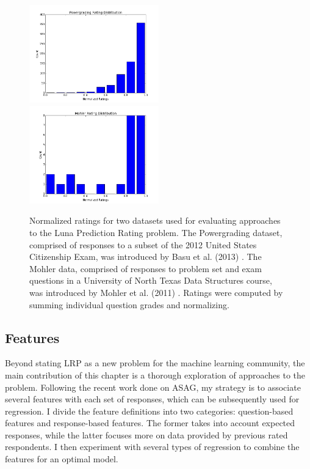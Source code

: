 \begin{figure}[h]
\centerline{%
\includegraphics[width=0.5\textwidth]{figures/powerGradingDistribution.png}%
\includegraphics[width=0.5\textwidth] {figures/mohlerRatings.png}%
}%
\caption{Normalized ratings for two datasets used for evaluating approaches to the Luna Prediction Rating problem. The Powergrading dataset, comprised of responses to a subset of the 2012 United States Citizenship Exam, was introduced by Basu et al. (2013)  \citep{basu2013powergrading}. The Mohler data, comprised of responses to problem set and exam questions in a University of North Texas Data Structures course, was introduced by Mohler et al. (2011)  \citep{mohler2011learning}. Ratings were computed by summing individual question grades and normalizing.}
\label{fig:RatingDistribution}
\end{figure}

\subsection{Features}

Beyond stating LRP as a new problem for the machine learning community, the main contribution of this chapter is a thorough exploration of approaches to the problem. Following the recent work done on ASAG, my strategy is to associate several features with each set of responses, which can be subsequently used for regression. I divide the feature definitions into two categories: question-based features and response-based features. The former takes into account expected responses, while the latter focuses more on data provided by previous rated respondents. I then experiment with several types of regression to combine the features for an optimal model.

